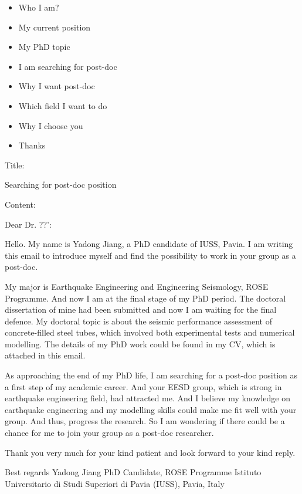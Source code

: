\documentclass[a4paper]{article}
\begin{document}
\begin{itemize}
	\item Who I am?
	\item My current position
	\item My PhD topic
	\item I am searching for post-doc
	\item Why I want post-doc
	\item Which field I want to do
	\item Why I choose you
	\item Thanks
\end{itemize}




Title:

Searching for post-doc position

Content:

Dear Dr. ??':

Hello. My name is Yadong Jiang, a PhD candidate of IUSS, Pavia. I am writing this email to introduce myself and find the possibility to work in your group as a post-doc.

My major is Earthquake Engineering and Engineering Seismology, ROSE Programme. And now I am at the final stage of my PhD period. The doctoral dissertation of mine had been submitted and now I am waiting for the final defence. My doctoral topic is about the seismic performance assessment of concrete-filled steel tubes, which involved both experimental tests and numerical modelling. The details of my PhD work could be found in my CV, which is attached in this email. 

As approaching the end of my PhD life, I am searching for a post-doc position as a first step of my academic career. And your EESD group, which is strong in earthquake engineering field, had attracted me. And I believe my knowledge on earthquake engineering and my modelling skills could make me fit well with your group. And thus, progress the research. So I am wondering if there could be a chance for me to join your group as a post-doc researcher.

Thank you very much for your kind patient and look forward to your kind reply.

Best regards
Yadong Jiang
PhD Candidate, ROSE Programme
Istituto Universitario di Studi Superiori di Pavia (IUSS), Pavia, Italy
\end{document}
